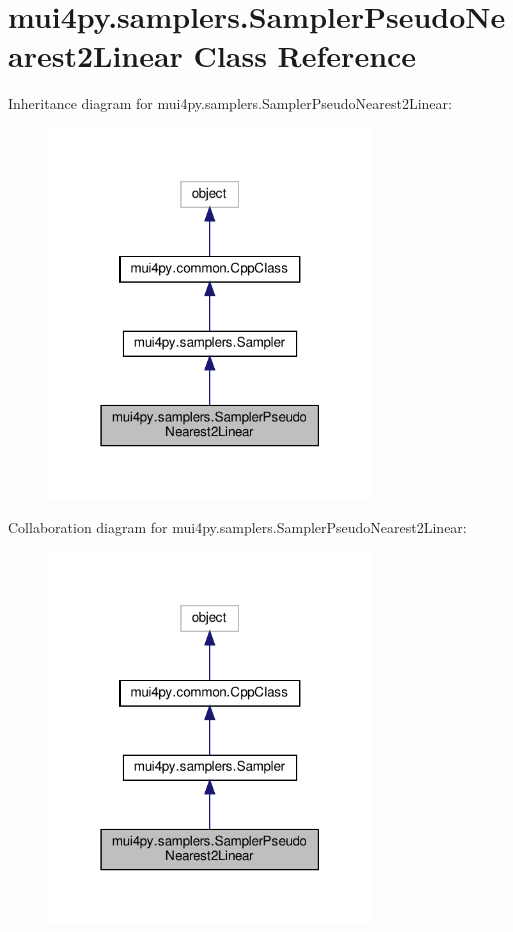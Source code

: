 \hypertarget{classmui4py_1_1samplers_1_1_sampler_pseudo_nearest2_linear}{}\section{mui4py.\+samplers.\+Sampler\+Pseudo\+Nearest2\+Linear Class Reference}
\label{classmui4py_1_1samplers_1_1_sampler_pseudo_nearest2_linear}


Inheritance diagram for mui4py.\+samplers.\+Sampler\+Pseudo\+Nearest2\+Linear\+:
\nopagebreak
\begin{figure}[H]
\begin{center}
\leavevmode
\includegraphics[width=243pt]{classmui4py_1_1samplers_1_1_sampler_pseudo_nearest2_linear__inherit__graph}
\end{center}
\end{figure}


Collaboration diagram for mui4py.\+samplers.\+Sampler\+Pseudo\+Nearest2\+Linear\+:
\nopagebreak
\begin{figure}[H]
\begin{center}
\leavevmode
\includegraphics[width=243pt]{classmui4py_1_1samplers_1_1_sampler_pseudo_nearest2_linear__coll__graph}
\end{center}
\end{figure}
